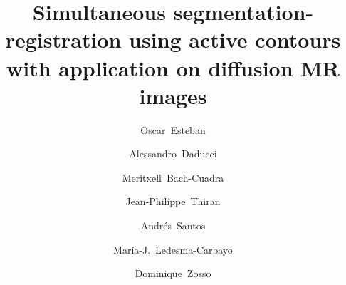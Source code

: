 \documentclass[5p,numbers,sort&compress]{elsarticle}
\begin{document}
\begin{frontmatter}


\title{Simultaneous segmentation-registration using active contours with application on
diffusion MR images}

\author[bit]{Oscar~Esteban}
\author[lts5]{Alessandro~Daducci}
\author[chuv,lts5]{Meritxell~Bach-Cuadra}
\author[lts5]{Jean-Philippe~Thiran}
\author[bit]{Andr\'es~Santos}
\author[bit]{Mar\'ia-J.~Ledesma-Carbayo}
\author[ucla]{Dominique~Zosso}


\address[bit]{Biomedical Image Technologies (BIT), ETSI Telecomunicaci\'on, %
Universidad Polit\'ecnica de Madrid and CIBER-BBN, Madrid, Spain}
\address[lts5]{Signal Processing Laboratory (LTS5), \'Ecole Polytechnique
F\'ed\'erale de Lausanne (EPFL), Lausanne, Switzerland}
\address[chuv]{Dept. of Radiology, University
Hospital Center (CHUV) and University of Lausanne (UNIL), Lausanne, Switzerland}
\address[ucla]{Department of Mathematics, University of California,
Los Angeles (UCLA), Los Angeles, CA, US}



\end{frontmatter}
\end{document}
